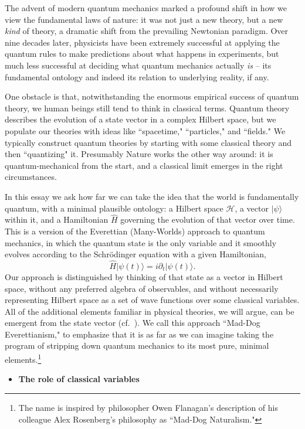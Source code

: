 \documentclass[12pt,english]{article}
\newcommand{\be}{\begin{equation}}
\newcommand{\ee}{\end{equation}}
\newcommand{\HH}{\mathcal{H}}
\begin{document}
The advent of modern quantum mechanics marked a profound shift in how we view the fundamental laws of nature: it was not just a new theory, but a new \emph{kind} of theory, a dramatic shift from the prevailing Newtonian paradigm.
Over nine decades later, physicists have been extremely successful at applying the quantum rules to make predictions about what happens in experiments, but much less successful at deciding what quantum mechanics actually \emph{is} -- its fundamental ontology and indeed its relation to underlying reality, if any.

One obstacle is that, notwithstanding the enormous empirical success of quantum theory, we human beings still tend to think in classical terms.
Quantum theory describes the evolution of a state vector in a complex Hilbert space, but we populate our theories with ideas like ``spacetime," ``particles," and ``fields."
We typically construct quantum theories by starting with some classical theory and then ``quantizing" it.
Presumably Nature works the other way around: it is quantum-mechanical from the start, and a classical limit emerges in the right circumstances.

In this essay we ask how far we can take the idea that the world is fundamentally quantum, with a minimal plausible ontology: a Hilbert space $\HH$, a vector $|\psi\rangle$ within it, and a Hamiltonian $\hat H$ governing the evolution of that vector over time.
This is a version of the Everettian (Many-Worlds) approach to quantum mechanics, in which the quantum state is the only variable and it smoothly evolves according to the Schr\"odinger equation with a given Hamiltonian,
\be
  \hat H |\psi(t)\rangle = i \partial_t|\psi(t)\rangle.
\ee
Our approach is distinguished by thinking of that state as a vector in Hilbert space, without any preferred algebra of observables, and without necessarily representing Hilbert space as a set of wave functions over some classical variables.
All of the additional elements familiar in physical theories, we will argue, can be emergent from the state vector (cf.\ \cite{Giddings:2015lla}).
We call this approach ``Mad-Dog Everettianism," to emphasize that it is as far as we can imagine taking the program of stripping down quantum mechanics to its most pure, minimal elements.\footnote{The name is inspired by philosopher Owen Flanagan's description of his colleague Alex Rosenberg's philosophy as ``Mad-Dog Naturalism."}


\begin{itemize}
\item \textbf{The role of classical variables}
\end{itemize}
\end{document}
